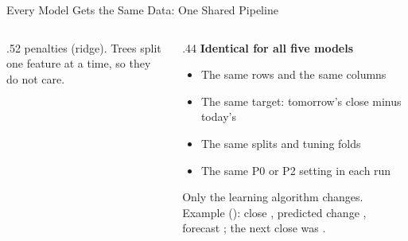 \documentclass[aspectratio=169,11pt]{beamer}
\begin{document}
\begin{frame}{Every Model Gets the Same Data: One Shared Pipeline}
\begin{columns}[T,onlytextwidth]
\begin{column}{.52\textwidth}
      penalties (ridge). Trees split one feature at a time, so they do not care.
    \end{column}
    \begin{column}{.44\textwidth}
      \small\textbf{Identical for all five models}
      \begin{itemize}\scriptsize\setlength{\itemsep}{0pt}
        \item The same rows and the same \NFeatures{} columns
        \item The same target: tomorrow's close minus today's
        \item The same splits and tuning folds
        \item The same P0 or P2 setting in each run
      \end{itemize}
      \vspace{1mm}
      \scriptsize Only the learning algorithm changes. Example (\ExDate): close \ExCt, predicted change
      \ExDelta, forecast \ExPred; the next close was \ExActual.
    \end{column}
  \end{columns}
\end{frame}
\end{document}
